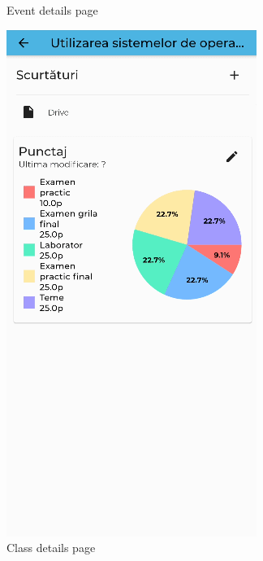 \begin{figure}[!ht]
\begin{minipage}[b]{0.26\textwidth}
        \caption{Event details page}
        \label{3:fig:event}
    \end{minipage}
    \hfill
    \begin{minipage}[b]{0.26\textwidth}
        \captionsetup{justification=centering}
        \includegraphics[width=\textwidth]{figures/beforedev/image4.png}
        \caption{Class details page}
        \label{3:fig:class}
    \end{minipage}
    
\end{figure}


